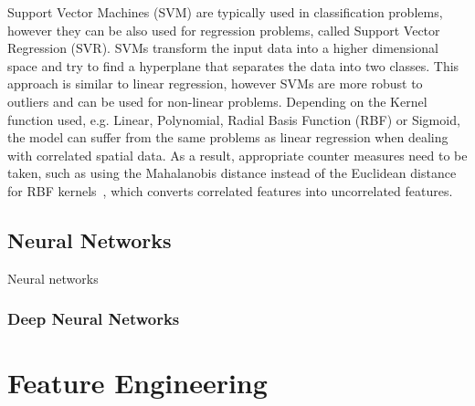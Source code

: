 Support Vector Machines (SVM) are typically used in classification problems, however they can be also used for regression problems, called Support Vector Regression (SVR). SVMs transform the input data into a higher dimensional space and try to find a hyperplane that separates the data into two classes. This approach is similar to linear regression, however SVMs are more robust to outliers and can be used for non-linear problems. Depending on the Kernel function used, e.g. Linear, Polynomial, Radial Basis Function (RBF) or Sigmoid, the model can suffer from the same problems as linear regression when dealing with correlated spatial data.
As a result, appropriate counter measures need to be taken, such as using the Mahalanobis distance instead of the Euclidean distance for RBF kernels~\cite{kamada2006support}, which converts correlated features into uncorrelated features.

\subsection{Neural Networks}

Neural networks 

\subsubsection{Deep Neural Networks}


\section{Feature Engineering}

